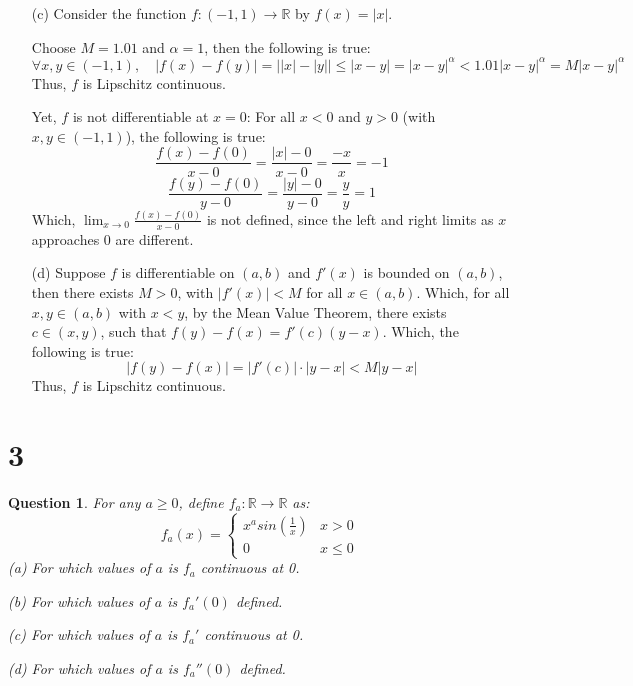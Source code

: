 \documentclass{article}
\newtheorem{question}{Question}
\begin{document}
\begin{itemize}
    \hfill

    \item[(c)] Consider the function $f:(-1,1)\rightarrow\mathbb{R}$ by $f(x)=|x|$.
    
    Choose $M=1.01$ and $\alpha=1$, then the following is true:
    $$\forall x,y\in (-1,1),\quad |f(x)-f(y)| = \left||x|-|y|\right| \leq |x-y| = |x-y|^\alpha<1.01|x-y|^\alpha = M|x-y|^\alpha$$
    Thus, $f$ is Lipschitz continuous.

    Yet, $f$ is not differentiable at $x=0$: For all $x<0$ and $y>0$ (with $x,y\in(-1,1)$), the following is true:
    $$\frac{f(x)-f(0)}{x-0} = \frac{|x|-0}{x-0} = \frac{-x}{x} = -1$$
    $$\frac{f(y)-f(0)}{y-0}=\frac{|y|-0}{y-0}=\frac{y}{y}=1$$
    Which, $\lim_{x\rightarrow 0}\frac{f(x)-f(0)}{x-0}$ is not defined, since the left and right limits as $x$ approaches $0$ are different.

    \hfill
    
    \item[(d)] Suppose $f$ is differentiable on $(a,b)$ and $f'(x)$ is bounded on $(a,b)$, then there exists $M>0$, with $|f'(x)|<M$ for all $x\in (a,b)$.
    Which, for all $x,y\in (a,b)$ with $x< y$, by the Mean Value Theorem, there exists $c\in (x,y)$, such that
    $f(y)-f(x) = f'(c)(y-x)$. Which, the following is true:
    $$|f(y)-f(x)| = |f'(c)|\cdot|y-x| < M|y-x|$$
    Thus, $f$ is Lipschitz continuous.
    

\end{itemize}

\break

\section*{3}
\begin{myBox}[]{}
    \begin{question}
        For any $a\geq 0$, define $f_a:\mathbb{R}\rightarrow\mathbb{R}$ as:
        $$f_a(x)=\begin{cases}
            x^asin(\frac{1}{x}) & x> 0\\
            0 & x\leq 0
        \end{cases}$$
        (a) For which values of $a$ is $f_a$ continuous at 0.
        
        (b) For which values of $a$ is $f_a'(0)$ defined.
        
        (c) For which values of $a$ is $f_a'$ continuous at 0.
        
        (d) For which values of $a$ is $f_a''(0)$ defined.
    \end{question}
\end{myBox}
\end{document}
